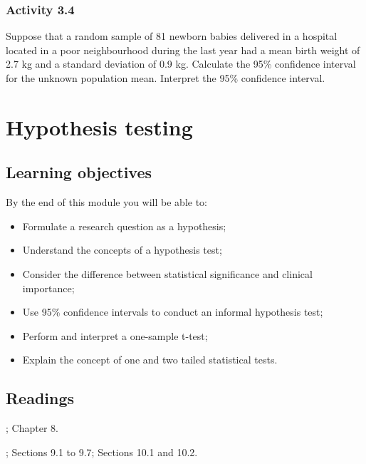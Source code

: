 \documentclass[
]{memoir}
\providecommand{\tightlist}{%
  \setlength{\itemsep}{0pt}\setlength{\parskip}{0pt}}
\begin{document}
\hypertarget{activity-3.4}{%
\subsection*{Activity 3.4}\label{activity-3.4}}

Suppose that a random sample of 81 newborn babies delivered in a hospital located in a poor neighbourhood during the last year had a mean birth weight of 2.7 kg and a standard deviation of 0.9 kg. Calculate the 95\% confidence interval for the unknown population mean. Interpret the 95\% confidence interval.

\hypertarget{hypothesis-testing}{%
\chapter{Hypothesis testing}\label{hypothesis-testing}}

\hypertarget{learning-objectives-3}{%
\section*{Learning objectives}\label{learning-objectives-3}}

By the end of this module you will be able to:

\begin{itemize}
\tightlist
\item
  Formulate a research question as a hypothesis;
\item
  Understand the concepts of a hypothesis test;
\item
  Consider the difference between statistical significance and clinical importance;
\item
  Use 95\% confidence intervals to conduct an informal hypothesis test;
\item
  Perform and interpret a one-sample t-test;
\item
  Explain the concept of one and two tailed statistical tests.
\end{itemize}

\hypertarget{readings-3}{%
\section*{Readings}\label{readings-3}}

\citet{kirkwood_sterne01}; Chapter 8.

\citet{bland15}; Sections 9.1 to 9.7; Sections 10.1 and 10.2.
\end{document}
